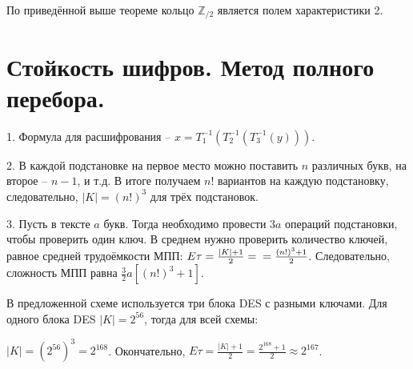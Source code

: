 \documentclass[letterpaper,11pt,openany]{book}
\begin{document}
По приведённой выше теореме кольцо $\mathbb{Z}_{/2}$ является полем характеристики 2.


\section{Стойкость шифров. Метод полного перебора.}


1. Формула для расшифрования -- $x = T_1^{-1}(T_2^{-1}(T_3^{-1}(y))).$

2. В каждой подстановке на первое место можно поставить $n$ различных букв, на второе -- $n - 1$, и т.д. В итоге получаем $n!$ вариантов на каждую подстановку, следовательно, $|K| = (n!)^3$ для трёх подстановок.

3. Пусть в тексте $a$ букв. Тогда необходимо провести $3a$ операций подстановки, чтобы проверить один ключ. В среднем нужно проверить количество ключей, равное средней трудоёмкости МПП: $E\tau = \frac{|K| + 1}{2} = \\ = \frac{(n!)^3 + 1}{2}$. Следовательно, сложность МПП равна $\frac{3}{2}a[(n!)^3 + 1].$


В предложенной схеме используется три блока DES с разными ключами. Для одного блока DES $|K| = 2 ^ {56}$, тогда для всей схемы:

\noindent $|K| = (2 ^ {56}) ^ 3 = 2 ^ {168}$. Окончательно, $E\tau = \frac{|K| + 1}{2} = \frac{2 ^ {168} + 1}{2} \approx 2 ^ {167}$.

\end{document}
